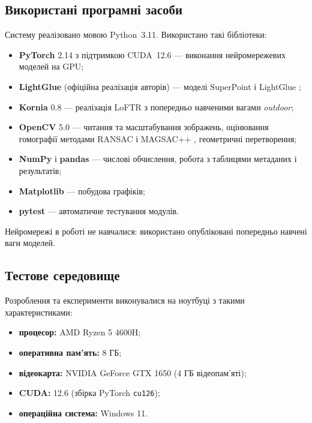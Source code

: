 \documentclass[a4paper, 12pt, titlepage]{article}
\begin{document}
\subsection{Використані програмні засоби}

Систему реалізовано мовою Python~3.11. Використано такі бібліотеки:
\begin{itemize}[label=\textbf{•}]
    \item \textbf{PyTorch} 2.14 з підтримкою CUDA~12.6 \cite{pytorch} --- виконання нейромережевих моделей на GPU;
    \item \textbf{LightGlue} (офіційна реалізація авторів) --- моделі SuperPoint \cite{superpoint} і LightGlue \cite{lightglue};
    \item \textbf{Kornia} 0.8 \cite{kornia} --- реалізація LoFTR \cite{loftr} з попередньо навченими вагами \textit{outdoor};
    \item \textbf{OpenCV} 5.0 \cite{opencv} --- читання та масштабування зображень, оцінювання гомографії методами RANSAC \cite{ransac} і MAGSAC++ \cite{magsac}, геометричні перетворення;
    \item \textbf{NumPy} і \textbf{pandas} --- числові обчислення, робота з таблицями метаданих і результатів;
    \item \textbf{Matplotlib} --- побудова графіків;
    \item \textbf{pytest} --- автоматичне тестування модулів.
\end{itemize}

Нейромережі в роботі не навчалися: використано опубліковані попередньо навчені ваги моделей.

\subsection{Тестове середовище}

Розроблення та експерименти виконувалися на ноутбуці з такими характеристиками:
\begin{itemize}[label=\textbf{--}]
    \item \textbf{процесор:} AMD Ryzen 5 4600H;
    \item \textbf{оперативна пам'ять:} 8 ГБ;
    \item \textbf{відеокарта:} NVIDIA GeForce GTX 1650 (4 ГБ відеопам'яті);
    \item \textbf{CUDA:} 12.6 (збірка PyTorch \texttt{cu126});
    \item \textbf{операційна система:} Windows 11.
\end{itemize}
\end{document}
